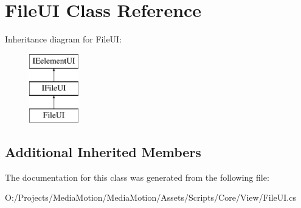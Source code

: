\hypertarget{class_file_u_i}{\section{File\+U\+I Class Reference}
\label{class_file_u_i}
}
Inheritance diagram for File\+U\+I\+:\begin{figure}[H]
\begin{center}
\leavevmode
\includegraphics[height=3.000000cm]{class_file_u_i}
\end{center}
\end{figure}
\subsection*{Additional Inherited Members}


The documentation for this class was generated from the following file\+:\begin{DoxyCompactItemize}
\item 
O\+:/\+Projects/\+Media\+Motion/\+Media\+Motion/\+Assets/\+Scripts/\+Core/\+View/File\+U\+I.\+cs\end{DoxyCompactItemize}
